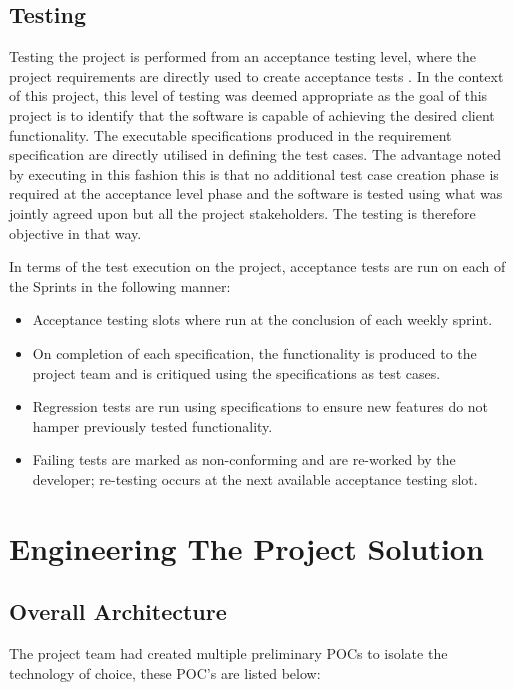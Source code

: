 \documentclass[12pt]{witseiepaper}
\begin{document}
\subsection{Testing}
Testing the project is performed from an acceptance testing level, where the project requirements are directly used to create acceptance tests \cite{AcceptanceTest}. In the context of this project, this level of testing was deemed appropriate as the goal of this project is to identify that the software is capable of achieving the desired client functionality.
The executable specifications produced in the requirement specification are directly utilised in defining the test cases. The advantage noted by executing in this fashion this is that no additional test case creation phase is required at the acceptance level phase and the software is tested using what was jointly agreed upon but all the project stakeholders. The testing is therefore objective in that way.

In terms of the test execution on the project, acceptance tests are run on each of the Sprints in the following manner:



\begin{itemize}
	\item Acceptance testing slots where run at the conclusion of each weekly sprint.
	\item On completion of each specification, the functionality is produced to the project team and is critiqued using the specifications as test cases.
	\item Regression tests are run using specifications to ensure new features do not hamper previously tested functionality.
	\item Failing tests are marked as non-conforming and are re-worked by the developer; re-testing occurs at the next available acceptance testing slot. 
\end{itemize}


\section{Engineering The Project Solution}

\subsection{Overall Architecture}
The project team had created multiple preliminary POCs to isolate the technology of choice, these POC's are listed below:
\end{document}
